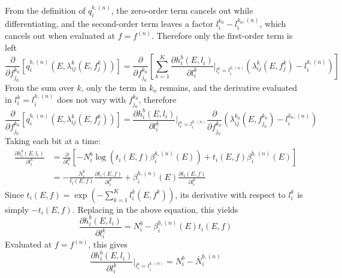 \documentclass[a4paper, 10pt]{article}
\begin{document}
From the definition of $q_i^{b, (n)}$, the zero-order term cancels out while differentiating, and the second-order term leaves a factor $ l_i^{k_0} - l_i^{k_0, (n)} $, which cancels out when evaluated at $f = f^{(n)}$. Therefore
only the first-order term is left
\begin{equation*}
  \frac{\partial }{\partial f_{j_0}^{k_0}} \left[ q_i^{b, (n)}\left(E, \lambda_{ij}^k\left( E, f_j^k\right)\right) \right] = \frac{\partial }{\partial f_{j_0}^{k_0}} \left[ \sum_{k=1}^K  \frac{\partial h_i^b(E, l_i)}{\partial l_i^{k}}\Bigr|_{l_i^k = l_i^{k, (n)}} (  \lambda_{ij}^k(E, f_j^k) - l_i^{k, (n)}) \right]
\end{equation*}
From the sum over $k$, only the term in $k_o$ remains, and the derivative evaluated in $l_i^k = l_i^{k, (n)}$ does not vary with $f_{j_0}^{k_0}$, therefore
\begin{equation*}
  \frac{\partial }{\partial f_{j_0}^{k_0}} \left[ q_i^{b, (n)}\left(E, \lambda_{ij}^k\left( E, f_j^k\right)\right) \right] = \frac{\partial h_i^b(E, l_i)}{\partial l_i^{k}}\Bigr|_{l_i^k = l_i^{k, (n)}} \frac{\partial }{\partial f_{j_0}^{k_0}}(  \lambda_{ij}^{k_0}(E, f_{j_0}^{k_0}) - l_i^{k_0, (n)})
\end{equation*}
Taking each bit at a time:
\begin{equation*}
 \begin{split}
   \frac{\partial h_i^b(E, l_i)}{\partial l_i^{k}} &= \frac{\partial}{\partial l_i^{k}} \left[ -N_i^b \log \left( t_i(E,f) \beta_i^{b, (n)}(E)\right) + t_i(E,f) \beta_i^{b, (n)}(E)\right] \\
   &= - \frac{N_i^b}{t_i(E,f)} \frac{\partial t_i(E,f)}{\partial l_i^{k}} + \beta_i^{b, (n)}(E)\frac{\partial t_i(E,f)}{\partial l_i^{k}}
 \end{split}
\end{equation*}
Since $t_i(E,f) = \exp(-\sum_{k=1}^K l_i^k(E, f^k))$, its derivative with respect to $l_i^k$ is simply $-t_i(E,f)$. Replacing in the above equation, this yields
\begin{equation*}
   \frac{\partial h_i^b(E, l_i)}{\partial l_i^{k}} = N_i^b - \beta_i^{b, (n)}(E)t_i(E,f)
\end{equation*}
Evaluated at $f = f^{(n)}$, this gives 
\begin{equation*}
   \frac{\partial h_i^b(E, l_i)}{\partial l_i^{k}}\Bigr|_{l_i^k = l_i^{k, (n)}} = N_i^b - \bar{N}_i^{b, (n)}
\end{equation*}
\end{document}
